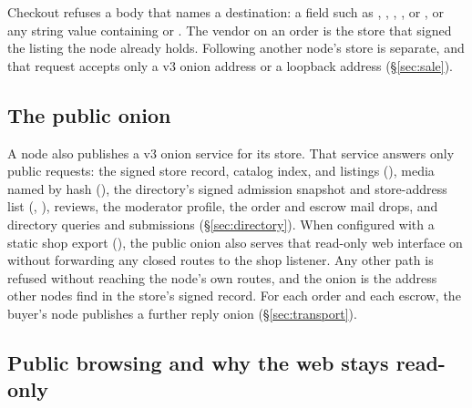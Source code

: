 Checkout refuses a body that names a destination: a field such as , , , , or , or any string value containing \code{://} or . The vendor on an order is the store that signed the listing the node already holds. Following another node's store is separate, and that request accepts only a v3 onion address or a loopback address (\S\ref{sec:sale}).

\subsection{The public onion}
\label{sec:public-onion}

A node also publishes a v3 onion service for its store. That service answers only public requests: the signed store record, catalog index, and listings (), media named by hash (), the directory's signed admission snapshot and store-address list (, ), reviews, the moderator profile, the order and escrow mail drops, and directory queries and submissions (\S\ref{sec:directory}). When configured with a static shop export (), the public onion also serves that read-only web interface on  without forwarding any closed routes to the shop listener. Any other path is refused without reaching the node's own routes, and the onion is the address other nodes find in the store's signed record. For each order and each escrow, the buyer's node publishes a further reply onion (\S\ref{sec:transport}).

\subsection{Public browsing and why the web stays read-only}
\label{sec:public-browsing}

